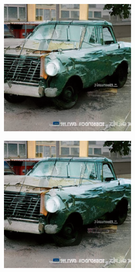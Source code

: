 \documentclass{article}
\begin{document}
\begin{figure}
\begin{subfigure}[b]{0.19\linewidth}
    \end{subfigure}
    \begin{subfigure}[b]{0.19\linewidth}
    \includegraphics[width=\linewidth]{figures/imagenet256/solver_samples/imagenet256_fm_ot_05_20.png}
    \end{subfigure}
    \begin{subfigure}[b]{0.19\linewidth}
    \includegraphics[width=\linewidth]{figures/imagenet256/solver_samples/imagenet256_fm_ot_05_30.png}

\end{subfigure}
\end{figure}
\end{document}
